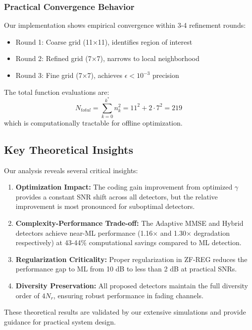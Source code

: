 \subsubsection{Practical Convergence Behavior}
Our implementation shows empirical convergence within 3-4 refinement rounds:
\begin{itemize}
    \item Round 1: Coarse grid (11×11), identifies region of interest
    \item Round 2: Refined grid (7×7), narrows to local neighborhood  
    \item Round 3: Fine grid (7×7), achieves $\epsilon < 10^{-3}$ precision
\end{itemize}

The total function evaluations are:
\begin{equation}
N_{total} = \sum_{k=0}^{k^*} n_k^2 = 11^2 + 2 \cdot 7^2 = 219
\end{equation}
which is computationally tractable for offline optimization.

\subsection{Key Theoretical Insights}

Our analysis reveals several critical insights:
\begin{enumerate}
    \item \textbf{Optimization Impact:} The coding gain improvement from optimized $\gamma$ provides a constant SNR shift across all detectors, but the relative improvement is most pronounced for suboptimal detectors.
    
    \item \textbf{Complexity-Performance Trade-off:} The Adaptive MMSE and Hybrid detectors achieve near-ML performance (1.16× and 1.30× degradation respectively) at 43-44\% computational savings compared to ML detection.
    
    \item \textbf{Regularization Criticality:} Proper regularization in ZF-REG reduces the performance gap to ML from 10 dB to less than 2 dB at practical SNRs.
    
    \item \textbf{Diversity Preservation:} All proposed detectors maintain the full diversity order of $4N_r$, ensuring robust performance in fading channels.
\end{enumerate}

These theoretical results are validated by our extensive simulations and provide guidance for practical system design.
